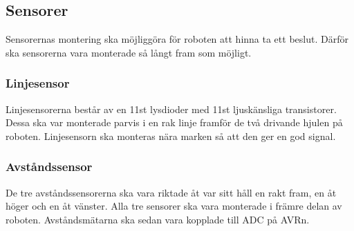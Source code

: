 \subsection{Sensorer}
Sensorernas montering ska möjliggöra för roboten att hinna ta ett beslut. Därför ska sensorerna vara monterade så långt fram som möjligt.

\subsubsection{Linjesensor}
Linjesensorerna består av en 11st lysdioder med 11st ljuskänsliga transistorer. Dessa ska var monterade parvis i en rak linje framför de två drivande hjulen på roboten. Linjesensorn ska monteras nära marken så att den ger en god signal.

\subsubsection{Avståndssensor}
De tre avståndssensorerna ska vara riktade åt var sitt håll en rakt fram, en åt höger och en åt vänster. Alla tre sensorer ska vara monterade i främre delan av roboten. Avståndsmätarna ska sedan vara kopplade till ADC på AVRn.